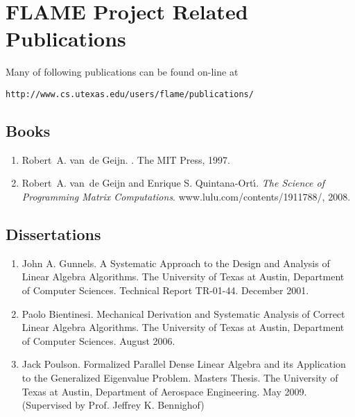 \chapter{FLAME Project Related Publications}
\label{appendix:pubs}

Many of following publications can be found on-line
at 
\begin{center}
{\tt http://www.cs.utexas.edu/users/flame/publications/} \\
\end{center}

\section{Books}

\renewcommand\labelenumi{B\theenumi}

\begin{enumerate}
\item
Robert~A. van~de Geijn.
.
\newblock The MIT Press, 1997.
\item
Robert~A. van~de Geijn and Enrique S. Quintana-Ort\'{\i}.
\newblock
{\em The Science of Programming Matrix Computations}.
\newblock www.lulu.com/contents/1911788/, 2008.
\end{enumerate}

\section{Dissertations}

\renewcommand\labelenumi{D\theenumi}

\begin{enumerate}
\item
John A. Gunnels.
A Systematic Approach to the Design and Analysis of Linear Algebra Algorithms.
The University of Texas at Austin, Department of Computer Sciences.
Technical Report TR-01-44.
December 2001.
\item
Paolo Bientinesi.
Mechanical Derivation and Systematic Analysis of Correct Linear Algebra
Algorithms.
The University of Texas at Austin, Department of Computer Sciences.
August 2006.
\item
Jack Poulson.
Formalized Parallel Dense Linear Algebra and its Application to the
Generalized Eigenvalue Problem.
Masters Thesis.
The University of Texas at Austin, Department of Aerospace Engineering.
May 2009.
(Supervised by Prof. Jeffrey K. Bennighof)
\end{enumerate}


